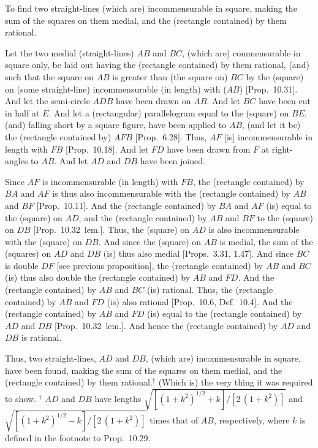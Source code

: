 To find two straight-lines (which are) incommensurable in square, making the sum of the squares on them medial,
and the (rectangle contained) by them rational.

\centerline{}

Let the two medial (straight-lines) $AB$ and $BC$,
(which are) commensurable in square only, be laid out having the
(rectangle contained) by them rational, (and) such that the square on
$AB$ is greater than (the square on) $BC$ by the (square) on (some straight-line)
incommensurable (in length) with ($AB$) [Prop.~10.31].
And let the semi-circle $ADB$ have been drawn on $AB$.
And let $BC$ have been cut in half at $E$. And let a (rectangular) parallelogram
equal to the (square) on $BE$, (and) falling short by a square figure,
have been applied to $AB$, (and let it be) the (rectangle
contained by) $AFB$ [Prop.~6.28].
Thus, $AF$ [is] incommensurable in length with $FB$
[Prop.~10.18]. And let 
$FD$ have been drawn from $F$ at right-angles to $AB$.
And let $AD$ and $DB$ have been joined.

Since $AF$ is incommensurable (in length) with $FB$, the (rectangle contained) by
$BA$ and $AF$ is thus also incommensurable with the (rectangle contained)
by $AB$ and $BF$ [Prop.~10.11].  And the
(rectangle contained) by $BA$ and $AF$ (is) equal to the (square) on $AD$, and the (rectangle contained) by $AB$ and $BF$ to the (square) on $DB$
[Prop.~10.32~lem.]. Thus, the (square) on
$AD$ is also incommensurable with the (square) on $DB$. And
since the (square) on $AB$ is medial, the sum of the (squares) on
$AD$ and $DB$ (is) thus also medial [Props.~3.31, 1.47]. And since $BC$ is double $DF$ [see previous proposition], the (rectangle
contained) by $AB$ and $BC$ (is) thus also double the (rectangle contained)
by $AB$ and $FD$. And the (rectangle contained) by $AB$ and $BC$ (is)
rational. Thus, the (rectangle contained) by $AB$ and $FD$
(is) also rational [Prop.~10.6, Def.~10.4]. And the (rectangle contained) by
$AB$ and $FD$ (is) equal to the (rectangle contained) by $AD$ and $DB$
[Prop.~10.32~lem.]. And hence the (rectangle
contained) by $AD$ and $DB$ is rational.

Thus, two straight-lines, $AD$ and $DB$, (which are) incommensurable
in square, have been found, making the sum of the squares on them medial,
and the (rectangle contained) by them rational.$^\dag$
(Which is) the very thing
it was required to show.
{\footnotesize\noindent$^\dag$ $AD$ and $DB$ have lengths $\sqrt{[(1+k^2)^{1/2}+k]/[2\,(1+k^2)]}$
and  $\sqrt{[(1+k^2)^{1/2}-k]/[2\,(1+k^2)]}$ times that of $AB$, respectively, where $k$ is defined in the footnote
to Prop.~10.29.}

